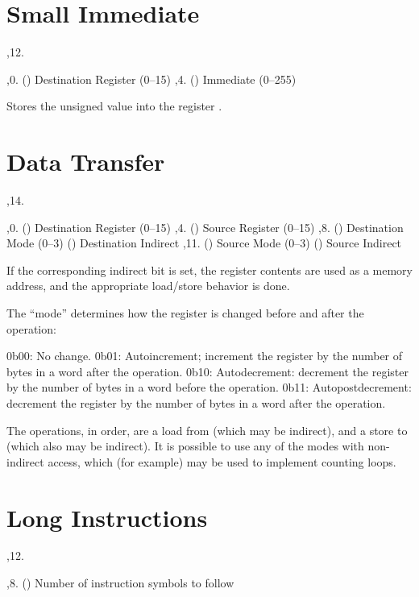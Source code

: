 \section{Small Immediate}

\noindent\ins{},12. 

\li \ins{},0. () Destination Register (0--15)
\li \ins{},4. () Immediate (0--255)

Stores the unsigned value  into the register .

\section{Data Transfer}

\noindent\ins{},14. 

\li \ins{},0. () Destination Register (0--15)
\li \ins{},4. () Source Register (0--15)
\li \ins{},8. () Destination Mode (0--3)
\li \ins{} () Destination Indirect
\li \ins{},11. () Source Mode (0--3)
\li \ins{} () Source Indirect

If the corresponding indirect bit is set, the register contents are used as a
memory address, and the appropriate load/store behavior is done.

The ``mode'' determines how the register is changed before and after the
operation:

\li 0b00: No change.
\li 0b01: Autoincrement; increment the register by the number of bytes in a
word after the operation.
\li 0b10: Autodecrement: decrement the register by the number of bytes in a
word before the operation.
\li 0b11: Autopostdecrement: decrement the register by the number of bytes in a
word after the operation.

The operations, in order, are a load from  (which may be indirect), and
a store to  (which also may be indirect). It is possible to use any of
the modes with non-indirect access, which (for example) may be used to
implement counting loops.

\section{Long Instructions}

\noindent\ins{},12. 

\li \ins{},8. () Number of instruction symbols to follow

